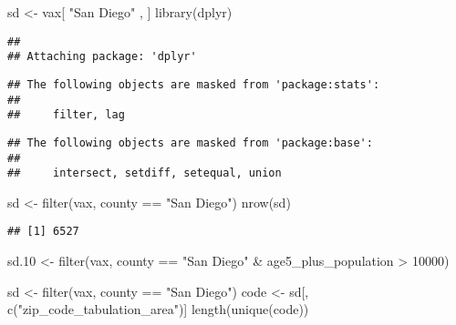 \documentclass[
]{article}
\newenvironment{Shaded}{\begin{snugshade}}{\end{snugshade}}
\newcommand{\DecValTok}[1]{\textcolor[rgb]{0.00,0.00,0.81}{#1}}
\newcommand{\FloatTok}[1]{\textcolor[rgb]{0.00,0.00,0.81}{#1}}
\newcommand{\FunctionTok}[1]{\textcolor[rgb]{0.00,0.00,0.00}{#1}}
\newcommand{\NormalTok}[1]{#1}
\newcommand{\OtherTok}[1]{\textcolor[rgb]{0.56,0.35,0.01}{#1}}
\newcommand{\SpecialCharTok}[1]{\textcolor[rgb]{0.00,0.00,0.00}{#1}}
\newcommand{\StringTok}[1]{\textcolor[rgb]{0.31,0.60,0.02}{#1}}
\begin{document}
\begin{Shaded}
\begin{Highlighting}[]
\NormalTok{sd }\OtherTok{\textless{}{-}}\NormalTok{ vax[ }\StringTok{"San Diego"}\NormalTok{ , ]}
\FunctionTok{library}\NormalTok{(dplyr)}
\end{Highlighting}
\end{Shaded}

\begin{verbatim}
## 
## Attaching package: 'dplyr'
\end{verbatim}

\begin{verbatim}
## The following objects are masked from 'package:stats':
## 
##     filter, lag
\end{verbatim}

\begin{verbatim}
## The following objects are masked from 'package:base':
## 
##     intersect, setdiff, setequal, union
\end{verbatim}

\begin{Shaded}
\begin{Highlighting}[]
\NormalTok{sd }\OtherTok{\textless{}{-}} \FunctionTok{filter}\NormalTok{(vax, county }\SpecialCharTok{==} \StringTok{"San Diego"}\NormalTok{)}
\FunctionTok{nrow}\NormalTok{(sd)}
\end{Highlighting}
\end{Shaded}

\begin{verbatim}
## [1] 6527
\end{verbatim}

\begin{Shaded}
\begin{Highlighting}[]
\NormalTok{sd}\FloatTok{.10} \OtherTok{\textless{}{-}} \FunctionTok{filter}\NormalTok{(vax, county }\SpecialCharTok{==} \StringTok{"San Diego"} \SpecialCharTok{\&}\NormalTok{ age5\_plus\_population }\SpecialCharTok{\textgreater{}} \DecValTok{10000}\NormalTok{)}
\end{Highlighting}
\end{Shaded}

\begin{Shaded}
\begin{Highlighting}[]
\NormalTok{sd }\OtherTok{\textless{}{-}} \FunctionTok{filter}\NormalTok{(vax, county }\SpecialCharTok{==} \StringTok{"San Diego"}\NormalTok{)}
\NormalTok{code }\OtherTok{\textless{}{-}}\NormalTok{ sd[, }\FunctionTok{c}\NormalTok{(}\StringTok{"zip\_code\_tabulation\_area"}\NormalTok{)]}
\FunctionTok{length}\NormalTok{(}\FunctionTok{unique}\NormalTok{(code))}
\end{Highlighting}
\end{Shaded}
\end{document}
